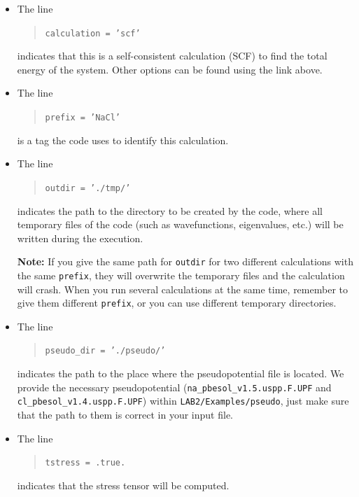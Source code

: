 \documentclass[12pt]{article}
\begin{document}
      \begin{itemize}
        \item
          The line
          \noindent
          \begin{quotation}
          {\tt calculation = 'scf'}
          \end{quotation}
          indicates that this is a self-consistent calculation (SCF) to find the total energy of the system. Other options can be found using the link above.

        \item
          The line
          \begin{quotation}
          {\tt prefix = 'NaCl'}
          \end{quotation}
          is a tag the code uses to identify this calculation. 

        \item
          The line
          \begin{quotation}
          {\tt outdir = './tmp/'}
          \end{quotation}
          indicates the path to the directory to be created by the code, where all temporary files of the code (such as wavefunctions, eigenvalues, etc.) will be written during the execution. 

          {\bf Note:} If you give the same path for {\tt outdir} for two different calculations with the same {\tt prefix}, they will overwrite the temporary files and the calculation will crash. When you run several calculations at the same time, remember to give them different {\tt prefix}, or you can use different temporary directories. 

        \item
          The line
          \begin{quotation}
          {\tt pseudo\_dir = './pseudo/'}
          \end{quotation}
          indicates the path to the place where the pseudopotential file is located. We provide the necessary pseudopotential 
          ({\tt na\_pbesol\_v1.5.uspp.F.UPF} and
          {\tt cl\_pbesol\_v1.4.uspp.F.UPF}) 
          within {\tt LAB2/Examples/pseudo}, just make sure that the path to them is correct in your input file.

        \item
          The line
          \begin{quotation}
          {\tt tstress = .true.}
          \end{quotation}
          indicates that the stress tensor will be computed. 


\end{itemize}
\end{document}
